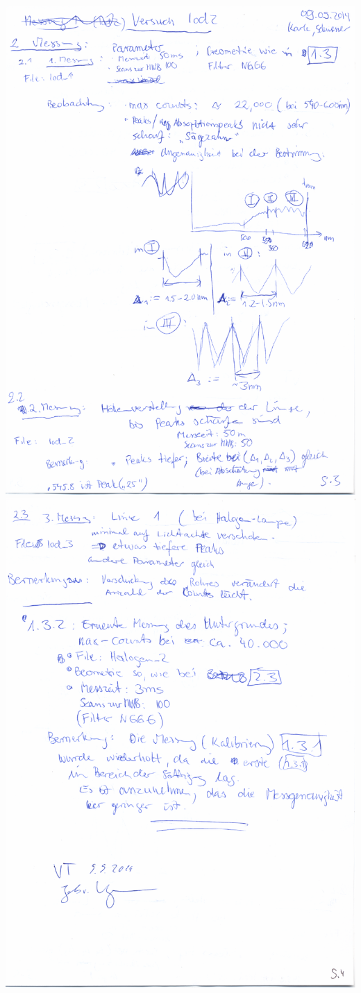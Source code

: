     \includegraphics[width=\linewidth]{record/iod2_record_03}
\clearpage
    \includegraphics[width=\linewidth]{record/iod2_record_04}
\clearpage

